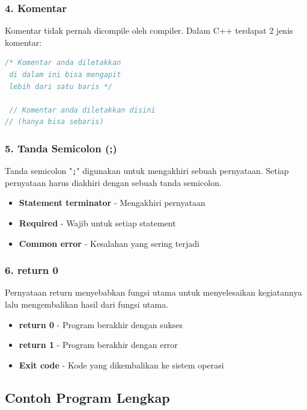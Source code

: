 \subsubsection{4. Komentar}

Komentar tidak pernah dicompile oleh compiler. Dalam C++ terdapat 2 jenis komentar:

\begin{lstlisting}[language=c++, numbers=none]
 /* Komentar anda diletakkan
 di dalam ini bisa mengapit
 lebih dari satu baris */

 // Komentar anda diletakkan disini
// (hanya bisa sebaris)
\end{lstlisting}

\subsubsection{5. Tanda Semicolon (;)}

Tanda semicolon "\texttt{;}" digunakan untuk mengakhiri sebuah pernyataan. Setiap pernyataan harus diakhiri dengan sebuah tanda semicolon.

\begin{itemize}
\item \textbf{Statement terminator} - Mengakhiri pernyataan
\item \textbf{Required} - Wajib untuk setiap statement
\item \textbf{Common error} - Kesalahan yang sering terjadi
\end{itemize}

\subsubsection{6. return 0}

Pernyataan return menyebabkan fungsi utama untuk menyelesaikan kegiatannya lalu mengembalikan hasil dari fungsi utama.

\begin{itemize}
\item \textbf{return 0} - Program berakhir dengan sukses
\item \textbf{return 1} - Program berakhir dengan error
\item \textbf{Exit code} - Kode yang dikembalikan ke sistem operasi
\end{itemize}

\subsection{Contoh Program Lengkap}

